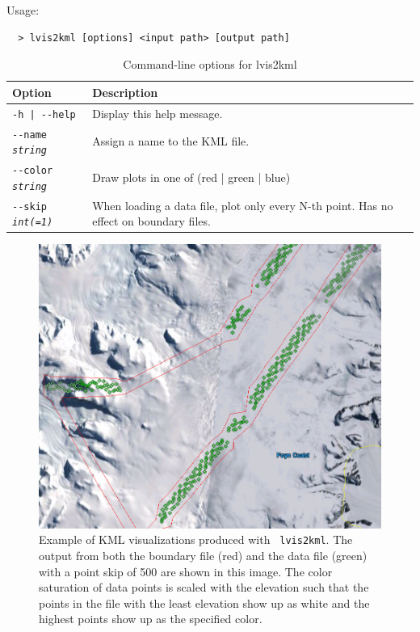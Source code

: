 Usage:
\begin{verbatim}
  > lvis2kml [options] <input path> [output path]
\end{verbatim}


\begin{longtable}{|l|p{7.5cm}|}
\caption{Command-line options for lvis2kml}
\label{tbl:lvis2kml}
\endfirsthead
\endhead
\endfoot
\endlastfoot
\hline
Option & Description \\ \hline \hline
\texttt{-h | -\/-help } & Display this help message.\\ \hline
\texttt{-\/-name  \textit{string}} & Assign a name to the KML file.\\ \hline
\texttt{-\/-color  \textit{string}} & Draw plots in one of (red | green | blue)\\ \hline
\texttt{-\/-skip  \textit{int(=1)}} & When loading a data file, plot only every N-th point.
Has no effect on boundary files.\\ \hline
\end{longtable}

\begin{figure}[!b]
  \begin{center}
  \includegraphics[width=6in]{images/lvis2kml_snap.png}
  \end{center}
  \caption{ Example of \ac{KML} visualizations produced with {\tt
      lvis2kml}.  The output from both the boundary file (red) and the data file
      (green) with a point skip of 500 are shown in this image.  The color saturation of
      data points is scaled with the elevation such that the points in the file with the least
      elevation show up as white and the highest points show up as the specified color.}
  \label{fig:lvis2kml_example}
\end{figure}


